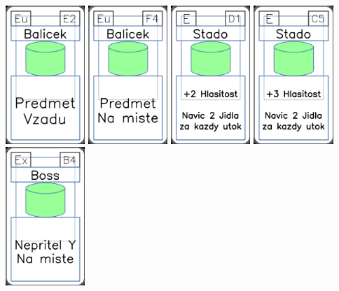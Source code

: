 \documentclass[a4paper]{article}
\begin{document}
	\includegraphics[width=3.0cm]{img-4_21}
	\includegraphics[width=3.0cm]{img-4_28}
	\includegraphics[width=3.0cm]{img-4_45}
	\includegraphics[width=3.0cm]{img-4_44}
	\includegraphics[width=3.0cm]{img-4_8}
\end{document}
